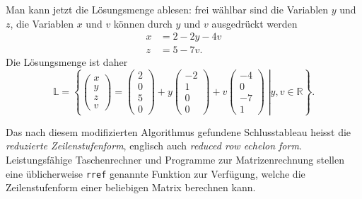 \begin{beispiel}
Man kann jetzt die Lösungsmenge ablesen: frei wählbar sind die Variablen 
$y$ und $z$, die Variablen $x$ und $v$ können durch $y$ und $v$ ausgedrückt
werden
\begin{align*}
x&=2-2y-4v\\
z&=5-7v.
\end{align*}
Die Lösungsmenge ist daher
\[
{\mathbb L}
=
\left\{
\left.
\begin{pmatrix}x\\y\\z\\v\end{pmatrix}
=
\begin{pmatrix}2\\0\\5\\0\end{pmatrix}
+y\begin{pmatrix}-2\\1\\0\\0\end{pmatrix}
+v\begin{pmatrix}-4\\0\\-7\\1\end{pmatrix}\;\right|
y,v\in\mathbb R
\right\}.
\]
\end{beispiel}

Das nach diesem modifizierten Algorithmus gefundene Schlusstableau heisst
die {\em reduzierte Zeilenstufenform}, englisch auch {\em reduced row echelon form}.
Leistungsfähige Taschenrechner und Programme zur Matrizenrechnung stellen
eine üblicherweise \texttt{rref} genannte Funktion zur Verfügung, welche die 
Zeilenstufenform einer beliebigen Matrix berechnen kann.

